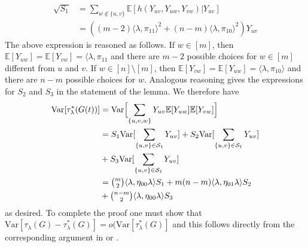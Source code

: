 \documentclass[final]{IEEEtran}
\theoremstyle{definition}
\begin{document}
\begin{IEEEproof}
\begin{equation}
\begin{split}
    \sqrt{S_1} &= \sum_{w \not \in \{u,v\}} \mathbb{E}[ h(Y_{uv},
    Y_{uw}, Y_{vw}) | Y_{uv}] \\ & = ((m-2) \langle \lambda, \pi_{11}
    \rangle^{2} + (n-m) \langle \lambda, \pi_{10} \rangle^{2})Y_{uv}
  \end{split}
\end{equation}
The above expression is reasoned as follows. If $w \in [m]$, then
$\mathbb{E}[Y_{uw}] = \mathbb{E}[Y_{vw}] = \langle \lambda,
\pi_{11}$ and there are $m-2$ possible choices for $w \in [m]$
different from $u$ and $v$. If $w \in [n] \setminus [m]$, then
$\mathbb{E}[Y_{vw}] = \mathbb{E}[Y_{uw}] = \langle \lambda, \pi_{10}
\rangle$ and there are $n - m$ possible choices for $w$. Analogous
reasoning gives the expressions for $S_2$ and $S_3$ in the statement
of the lemma. We therefore have
\begin{equation}
  \label{eq:60}
  \begin{split}
  \mathrm{Var}[\tau_{\lambda}^{*}(G(t))] &=  \mathrm{Var}\Bigl[\sum_{\{u,v,w\}} Y_{uv} \mathbb{E}[Y_{uw}]
      \mathbb{E}[Y_{vw}]\Bigr] \\ &=
      S_1 \mathrm{Var}[\sum_{\{u,v\} \in \mathcal{S}_1} Y_{uv}] + S_2
      \mathrm{Var}[\sum_{\{u,v\} \in \mathcal{S}_1} Y_{uv}] \\ &+ S_3
      \mathrm{Var}[\sum_{\{u,v\} \in \mathcal{S}_1} Y_{uv}] \\ &=
      \tbinom{m}{2} \langle \lambda, \eta_{00} \lambda \rangle S_1 +
      m(n-m) \langle \lambda, \eta_{01} \lambda \rangle S_2 \\ &+
      \tbinom{n-m}{2} \langle \lambda, \eta_{00} \lambda \rangle S_3
  \end{split}
\end{equation}
as desired. To complete the proof one must show that
$\mathrm{Var}[\tau_{\lambda}(G) - \tau_{\lambda}^{*}(G)] =
o(\mathrm{Var}[\tau_{\lambda}^{*}(G)]$ and this follows directly from
the corresponding argument in \cite{nowicki88:_subgr_u_statis_method}
or \cite{rukhin09:_asymp_analy_various_statis_random_graph_infer}.
\end{IEEEproof}
\end{document}

